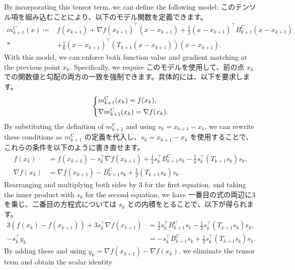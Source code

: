 \documentclass[0_main]{subfiles}
\begin{document}
\ifEn
    By incorporating this tensor term, we can define the following model:
\else
    このテンソル項を組み込むことにより、以下のモデル関数を定義できます。
\fi
\begin{align*}
    m_{k+1}^\mathrm{C}(x) \coloneqq{} & f(x_{k+1}) + \nabla f(x_{k+1})^\top (x - x_{k+1}) + \frac{1}{2} (x - x_{k+1})^\top B_{k+1}^{\mathrm{C}} (x - x_{k+1}) \\*
                                      & + \frac{1}{6}(x - x_{k+1})^\top (T_{k+1} (x - x_{k+1})) (x - x_{k+1}).
\end{align*}
\ifEn
    With this model, we can enforce both function value and gradient matching at the previous point $x_k$. Specifically, we require
\else
    このモデルを使用して、前の点 $x_k$ での関数値と勾配の両方の一致を強制できます。具体的には、以下を要求します。
\fi
\begin{equation*}
    \begin{dcases}
        m_{k+1}^\mathrm{C}(x_k) = f(x_k), \\
        \nabla m_{k+1}^\mathrm{C}(x_k) = \nabla f(x_k).
    \end{dcases}
\end{equation*}
\ifEn
    By substituting the definition of $m_{k+1}^\mathrm{C}$ and using $s_k = x_{k+1} - x_k$, we can rewrite these conditions as
\else
    $m_{k+1}^\mathrm{C}$ の定義を代入し、$s_k = x_{k+1} - x_k$ を使用することで、これらの条件を以下のように書き直せます。
\fi
\begin{align*}
    f(x_k)        & = f(x_{k+1}) - s_k^\top \nabla f(x_{k+1}) + \frac{1}{2} s_k^\top B_{k+1}^{\mathrm{C}} s_k - \frac{1}{6} s_k^\top (T_{k+1} s_k) s_k, \\
    \nabla f(x_k) & = \nabla f(x_{k+1}) - B_{k+1}^{\mathrm{C}} s_k + \frac{1}{2} (T_{k+1} s_k) s_k.
\end{align*}
\ifEn
    Rearranging and multiplying both sides by $3$ for the first equation, and taking the inner product with $s_k$ for the second equation, we have
\else
    一番目の式の両辺に3を乗じ、二番目の方程式については $s_k$ との内積をとることで、以下が得られます。
\fi
\begin{align*}
    3(f(x_k) - f(x_{k+1})) +3 s_k^\top \nabla f(x_{k+1}) & = \frac{3}{2} s_k^\top B_{k+1}^{\mathrm{C}} s_k - \frac{1}{2} s_k^\top (T_{k+1} s_k) s_k, \\
    -s_k^\top y_k                                        & = -s_k^\top B_{k+1}^{\mathrm{C}} s_k + \frac{1}{2} s_k^\top (T_{k+1} s_k) s_k.
\end{align*}
\ifEn
    By adding these and using $y_k = \nabla f(x_{k+1}) - \nabla f(x_k)$, we eliminate the tensor term and obtain the scalar identity
\end{document}
